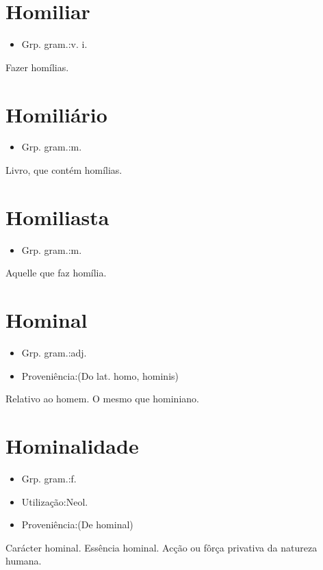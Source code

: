 \documentclass{article}
\begin{document}
\section{Homiliar}
\begin{itemize}
\item {Grp. gram.:v. i.}
\end{itemize}
Fazer homílias.
\section{Homiliário}
\begin{itemize}
\item {Grp. gram.:m.}
\end{itemize}
Livro, que contém homílias.
\section{Homiliasta}
\begin{itemize}
\item {Grp. gram.:m.}
\end{itemize}
Aquelle que faz homília.
\section{Hominal}
\begin{itemize}
\item {Grp. gram.:adj.}
\end{itemize}
\begin{itemize}
\item {Proveniência:(Do lat. \textunderscore homo\textunderscore , \textunderscore hominis\textunderscore )}
\end{itemize}
Relativo ao homem.
O mesmo que \textunderscore hominiano\textunderscore .
\section{Hominalidade}
\begin{itemize}
\item {Grp. gram.:f.}
\end{itemize}
\begin{itemize}
\item {Utilização:Neol.}
\end{itemize}
\begin{itemize}
\item {Proveniência:(De \textunderscore hominal\textunderscore )}
\end{itemize}
Carácter hominal.
Essência hominal.
Acção ou fôrça privativa da natureza humana.
\end{document}
